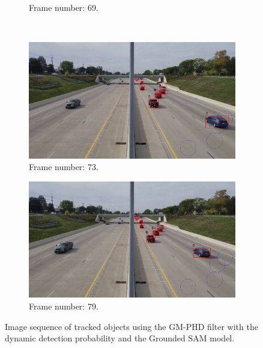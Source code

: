 \begin{figure}[H]
\begin{subfigure}{0.48\textwidth}
        \caption{Frame number: 69.}
        \label{fig:E1-V1-S3:06}
    \end{subfigure}
    \\
    \begin{subfigure}{0.48\textwidth}
        \centering
        \includegraphics[width=\linewidth]{../../../experiments/E1/V1/DINO/73}
        \caption{Frame number: 73.}
        \label{fig:E1-V1-S3:07}
    \end{subfigure}
    \begin{subfigure}{0.48\textwidth}
        \centering
        \includegraphics[width=\linewidth]{../../../experiments/E1/V1/DINO/78}
        \caption{Frame number: 79.}
        \label{fig:E1-V1-S3:08}
    \end{subfigure}
    \caption{Image sequence of tracked objects using the GM-PHD filter with the dynamic detection probability and
    the
    Grounded SAM model.}
    \label{fig:E1-V1-S3}
\end{figure}

